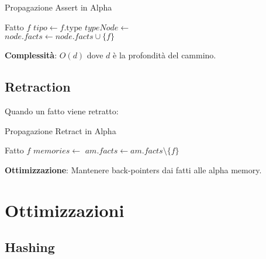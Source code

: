 \begin{algorithm}
\caption{Propagazione Assert in Alpha}
\begin{algorithmic}[1]
\Require Fatto $f$
  \State $tipo \gets f.\text{type}$
  \State $typeNode \gets $ 
    \State \Return {}
  \EndIf
  \State {}
\EndFunction
\\
      \State \Return {}
    \EndIf
  \EndIf
    \State $node.facts \gets node.facts \cup \{f\}$
    \State {}
  \EndIf
    \State {}
  \EndFor
\EndFunction
\end{algorithmic}
\end{algorithm}

\textbf{Complessità}: $O(d)$ dove $d$ è la profondità del cammino.

\subsection{Retraction}

Quando un fatto viene retratto:

\begin{algorithm}
\caption{Propagazione Retract in Alpha}
\begin{algorithmic}[1]
\Require Fatto $f$
  \State $memories \gets $ 
    \State $am.facts \gets am.facts \setminus \{f\}$
    \State {}
  \EndFor
\EndFunction
\end{algorithmic}
\end{algorithm}

\textbf{Ottimizzazione}: Mantenere back-pointers dai fatti alle alpha memory.

\section{Ottimizzazioni}

\subsection{Hashing}

